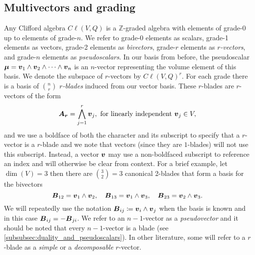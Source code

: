\subsection{Multivectors and grading}
Any Clifford algebra $C\ell(V,Q)$ is a $\mathbb{Z}$-graded algebra with elements of grade-0 up to elements of grade-$n$. We refer to grade-0 elements as scalars, grade-1 elements as vectors, grade-2 elements as \emph{bivectors}, grade-$r$ elements as \emph{$r$-vectors}, and grade-$n$ elements as \emph{pseudoscalars}. In our basis from before, the pseudoscalar $\boldsymbol{\mu} = \boldsymbol{v}_1 \wedge \boldsymbol{v}_2 \wedge \cdots \wedge \boldsymbol{v}_n$ is an $n$-vector representing the volume element of this basis. We denote the subspace of $r$-vectors by $C\ell(V,Q)^r$. For each grade there is a basis of ${n\choose r}$ \emph{$r$-blades} induced from our vector basis. These $r$-blades are $r$-vectors of the form
\begin{equation}
\label{eq:blade}
\boldsymbol{A_r} = \bigwedge_{j=1}^r \boldsymbol{v}_j, ~\textrm{for linearly independent}~ \boldsymbol{v}_j \in V,
\end{equation}
and we use a boldface of both the character and its subscript to specify that a $r$-vector is a $r$-blade and we note that vectors (since they are $1$-blades) will not use this subscript. Instead, a vector $\boldsymbol{v}$ may use a non-boldfaced subscript to reference an index and will otherwise be clear from context. For a brief example, let $\dim(V)=3$ then there are ${3\choose 2}=3$ canonical 2-blades that form a basis for the bivectors
\begin{equation}
\label{eq:3_dim_basis}
\boldsymbol{B}_{12} = \boldsymbol{v}_1 \wedge \boldsymbol{v}_2, \quad \boldsymbol{B}_{13} = \boldsymbol{v}_1 \wedge \boldsymbol{v}_3, \quad \boldsymbol{B}_{23} = \boldsymbol{v}_2 \wedge \boldsymbol{v}_3.
\end{equation}
We will repeatedly use the notation $\boldsymbol{B}_{ij} \coloneqq \boldsymbol{v}_i\wedge \boldsymbol{v}_j$ when the basis is known and in this case $\boldsymbol{B}_{ij}=-\boldsymbol{B}_{ji}$. We refer to an $n-1$-vector as a \emph{pseudovector} and it should be noted that every $n-1$-vector is a blade (see \cref{subsubsec:duality_and_pseudoscalars}). In other literature, some will refer to a $r$-blade as a \emph{simple} or a \emph{decomposable} $r$-vector. 

